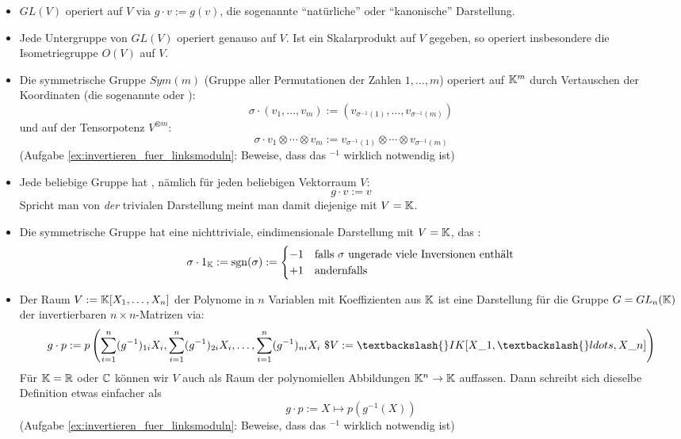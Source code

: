 \begin{example}
\begin{itemize}
\item $GL(V)$ operiert auf $V$ via $g\cdot v := g(v)$, die sogenannte \enquote{natürliche} oder \enquote{kanonische} Darstellung.
\item Jede Untergruppe von $GL(V)$ operiert genauso auf $V$. Ist ein Skalarprodukt auf $V$ gegeben, so operiert insbesondere die Isometriegruppe $O(V)$ auf $V$.
\item Die symmetrische Gruppe $Sym(m)$ (Gruppe aller Permutationen der Zahlen $1,\ldots,m$) operiert auf $\mathbb{K}^m$ durch Vertauschen der Koordinaten (die sogenannte  oder ):
\[\sigma \cdot (v_1,\ldots,v_m) := (v_{\sigma^{-1}(1)}, \ldots, v_{\sigma^{-1}(m)})\]
und auf der Tensorpotenz $V^{\otimes m}$:
\[\sigma \cdot v_1\otimes\cdots\otimes v_m := v_{\sigma^{-1}(1)}\otimes \cdots \otimes v_{\sigma^{-1}(m)} \]
(Aufgabe \ref{ex:invertieren_fuer_linksmoduln}: Beweise, dass das $^{-1}$ wirklich notwendig ist)
\item Jede beliebige Gruppe hat , nämlich für jeden beliebigen Vektorraum $V$:
\[g\cdot v := v\]
Spricht man von \emph{der} trivialen Darstellung meint man damit diejenige mit $V=\mathbb{K}$.
\item Die symmetrische Gruppe hat eine nichttriviale, eindimensionale Darstellung mit $V=\mathbb{K}$, das :
\[\sigma \cdot 1_{\mathbb{K}} := \operatorname{sgn}(\sigma) := \begin{cases} -1 & \text{falls $\sigma$ ungerade viele Inversionen enthält} \\ +1 & \text{andernfalls}\end{cases}\]
\item Der Raum $V:=\mathbb{K}[X_1, \ldots, X_n]$ der Polynome in $n$ Variablen mit Koeffizienten aus $\mathbb{K}$ ist eine Darstellung für die Gruppe $G=GL_n(\mathbb{K})$ der invertierbaren $n\times n$-Matrizen via:
\[g\cdot p := p\left(\sum_{i=1}^n (g^{-1})_{1i} X_i, \sum_{i=1}^n (g^{-1})_{2i} X_i, \ldots, \sum_{i=1}^n (g^{-1})_{ni} X_i\ \$V:=\textbackslash\{\}IK[X\_1, \textbackslash\{\}ldots, X\_n] \right)\]
Für $\mathbb{K}=\mathbb{R}$ oder $\mathbb{C}$ können wir $V$ auch als Raum der polynomiellen Abbildungen $\mathbb{K}^n \to \mathbb{K}$ auffassen. Dann schreibt sich dieselbe Definition etwas einfacher als
\[g \cdot p := X\mapsto p(g^{-1}(X))\]
(Aufgabe \ref{ex:invertieren_fuer_linksmoduln}: Beweise, dass das $^{-1}$ wirklich notwendig ist)
\end{itemize}
\end{example}

